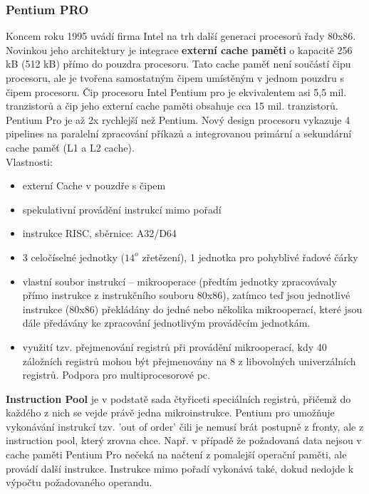 \subsubsection{Pentium PRO}
Koncem roku 1995 uvádí firma Intel na trh další generaci procesorů řady 80x86. Novinkou jeho architektury je integrace \textbf{externí cache paměti} o kapacitě 256 kB (512 kB) přímo do pouzdra procesoru. Tato cache paměť není součástí čipu procesoru, ale je tvořena samostatným čipem umístěným v jednom pouzdru s čipem procesoru. Čip procesoru Intel Pentium pro je ekvivalentem asi 5,5 mil. tranzistorů a čip jeho externí cache paměti obsahuje cca 15 mil. tranzistorů. Pentium Pro je až 2x rychlejší než Pentium. Nový design procesoru vykazuje 4 pipelines na paralelní zpracování příkazů a integrovanou primární a sekundární cache paměť (L1 a L2 cache). \\
Vlastnosti:
\begin{itemize}
\item externí Cache v pouzdře s čipem
\item spekulativní provádění instrukcí mimo pořadí
\item instrukce RISC, sběrnice: A32/D64
\item 3 celočíselné jednotky ($14^o$ zřetězení), 1 jednotka pro pohyblivé řadové čárky
\item vlastní soubor instrukcí – mikrooperace (předtím jednotky zpracovávaly přímo instrukce z instrukčního souboru 80x86), zatímco teď jsou jednotlivé instrukce (80x86) překládány  do jedné nebo několika mikrooperací, které jsou dále předávány ke zpracování jednotlivým prováděcím jednotkám.
\item využití tzv. přejmenování registrů při provádění mikrooperací, kdy 40 záložních registrů mohou být přejmenovány na 8 z libovolných univerzálních registrů. Podpora pro multiprocesorové pc.
\end{itemize}

\textbf{Instruction Pool} je v podstatě sada čtyřiceti speciálních registrů, přičemž do každého z nich se vejde právě jedna mikroinstrukce. Pentium pro umožňuje vykonávání instrukcí tzv. 'out of order' čili je nemusí brát postupně z fronty, ale z instruction pool, který zrovna chce. Např. v případě že požadovaná data nejsou v cache paměti Pentium Pro nečeká na načtení z pomalejší operační paměti, ale provádí další instrukce. Instrukce mimo pořadí vykonává také, dokud nedojde k výpočtu požadovaného operandu.

